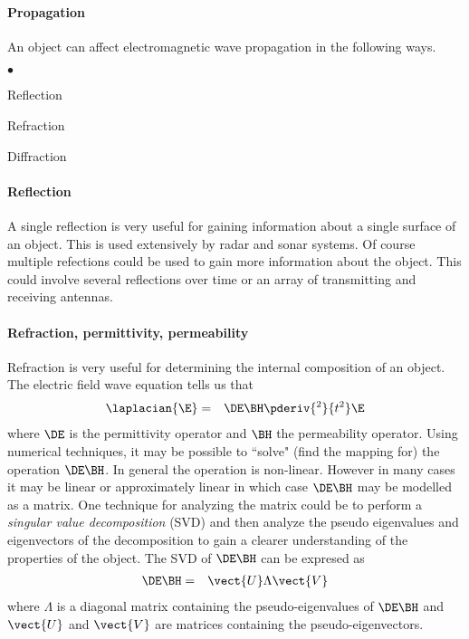 \paragraph{Propagation}
An object can affect electromagnetic wave propagation in the following ways.
\begin{list}{$\bullet$}{\setlength{\parsep }{0ex} \setlength{\itemsep}{0.5ex}}
   \item Reflection
   \item Refraction
   \item Diffraction
\end{list}

\paragraph{Reflection}
A single reflection is very useful for gaining information about a single surface of an object.
This is used extensively by radar and sonar systems.
Of course multiple refections could be used to gain more information about the object.
This could involve several reflections over time or an array of transmitting and receiving antennas.

\paragraph{Refraction, permittivity, permeability}
Refraction is very useful for determining the internal composition of an object.
The electric field wave equation tells us that
\begin{eqnarray*}
   \laplacian{\E} &=& \DE \BH \pderiv{^2}{t^2}\E
\end{eqnarray*}
where $\DE$ is the permittivity operator and $\BH$ the permeability operator.
Using numerical techniques, it may be possible to ``solve" (find the mapping for)
the operation $\DE \BH$.
In general the operation is non-linear.
However in many cases it may be linear or approximately linear in which case
$\DE \BH$ may be modelled as a matrix.
One technique for analyzing the matrix could be to perform a {\em singular value decomposition} (SVD)
and then analyze the pseudo eigenvalues and eigenvectors of the decomposition to
gain a clearer understanding of the properties of the object.  The SVD of $\DE\BH$ can
be expresed as
\begin{eqnarray*}
   \DE\BH &=& \vect{U} \Lambda \vect{V}
\end{eqnarray*}
where $\Lambda$ is a diagonal matrix containing the pseudo-eigenvalues of $\DE\BH$
and $\vect{U}$ and $\vect{V}$ are matrices containing
the pseudo-eigenvectors.


